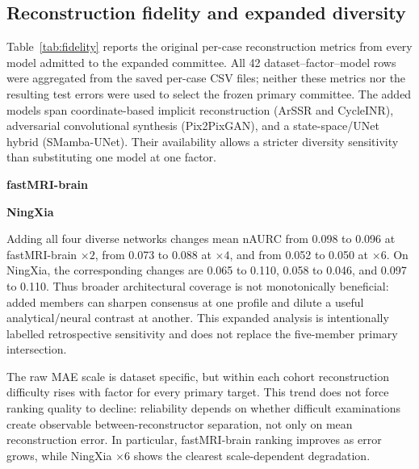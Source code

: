 \documentclass{article}
\begin{document}
\subsection{Reconstruction fidelity and expanded diversity}
Table~\ref{tab:fidelity} reports the original per-case reconstruction metrics from every model admitted to the expanded committee. All 42 dataset--factor--model rows were aggregated from the saved per-case CSV files; neither these metrics nor the resulting test errors were used to select the frozen primary committee. The added models span coordinate-based implicit reconstruction (ArSSR and CycleINR), adversarial convolutional synthesis (Pix2PixGAN), and a state-space/UNet hybrid (SMamba-UNet). Their availability allows a stricter diversity sensitivity than substituting one model at one factor.

\begin{table}[!t]
 \centering
 \caption{Reconstruction fidelity for the seven neural outputs available at every factor. Metrics use each run's saved per-case generated-slice evaluation. Values are descriptive and were not used for committee selection.}
 \label{tab:fidelity}
 \begin{minipage}[t]{0.49\textwidth}
  \centering
  \textbf{fastMRI-brain}\\[2pt]
  \scriptsize
  \resizebox{\linewidth}{!}{}
 \end{minipage}\hfill
 \begin{minipage}[t]{0.49\textwidth}
  \centering
  \textbf{NingXia}\\[2pt]
  \scriptsize
  \resizebox{\linewidth}{!}{}
 \end{minipage}
\end{table}

Adding all four diverse networks changes mean nAURC from 0.098 to 0.096 at fastMRI-brain $\times2$, from 0.073 to 0.088 at $\times4$, and from 0.052 to 0.050 at $\times6$. On NingXia, the corresponding changes are 0.065 to 0.110, 0.058 to 0.046, and 0.097 to 0.110. Thus broader architectural coverage is not monotonically beneficial: added members can sharpen consensus at one profile and dilute a useful analytical/neural contrast at another. This expanded analysis is intentionally labelled retrospective sensitivity and does not replace the five-member primary intersection.

The raw MAE scale is dataset specific, but within each cohort reconstruction difficulty rises with factor for every primary target. This trend does not force ranking quality to decline: reliability depends on whether difficult examinations create observable between-reconstructor separation, not only on mean reconstruction error. In particular, fastMRI-brain ranking improves as error grows, while NingXia $\times6$ shows the clearest scale-dependent degradation.
\end{document}
